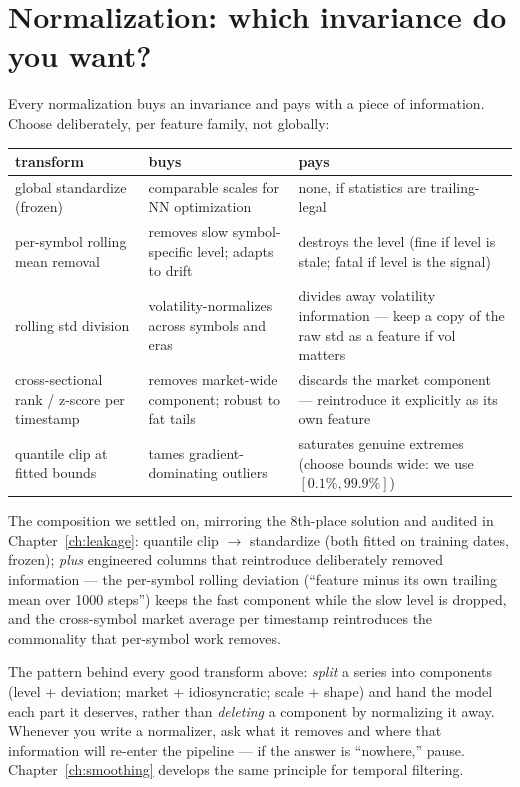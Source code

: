 \section{Normalization: which invariance do you want?}

Every normalization buys an invariance and pays with a piece of information.
Choose deliberately, per feature family, not globally:

\begin{center}
\begin{tabularx}{\textwidth}{@{}lXX@{}}
\toprule
transform & buys & pays \\
\midrule
global standardize (frozen) & comparable scales for NN optimization &
none, if statistics are trailing-legal \\
per-symbol rolling mean removal & removes slow symbol-specific level;
adapts to drift & destroys the level (fine if level is stale; fatal if
level is the signal) \\
rolling std division & volatility-normalizes across symbols and eras &
divides away volatility information --- keep a copy of the raw std as a
feature if vol matters \\
cross-sectional rank / z-score per timestamp & removes market-wide
component; robust to fat tails & discards the market component ---
reintroduce it explicitly as its own feature \\
quantile clip at fitted bounds & tames gradient-dominating outliers &
saturates genuine extremes (choose bounds wide: we use $[0.1\%, 99.9\%]$)\\
\bottomrule
\end{tabularx}
\end{center}

The composition we settled on, mirroring the 8th-place solution and audited
in Chapter~\ref{ch:leakage}: quantile clip $\to$ standardize (both fitted on
training dates, frozen); \emph{plus} engineered columns that reintroduce
deliberately removed information --- the per-symbol rolling deviation
(``feature minus its own trailing mean over 1000 steps'') keeps the fast
component while the slow level is dropped, and the cross-symbol market
average per timestamp reintroduces the commonality that per-symbol work
removes.

\begin{keybox}
The pattern behind every good transform above: \emph{split} a series into
components (level + deviation; market + idiosyncratic; scale + shape) and
hand the model each part it deserves, rather than \emph{deleting} a
component by normalizing it away. Whenever you write a normalizer, ask what
it removes and where that information will re-enter the pipeline --- if the
answer is ``nowhere,'' pause. Chapter~\ref{ch:smoothing} develops the same
principle for temporal filtering.
\end{keybox}

